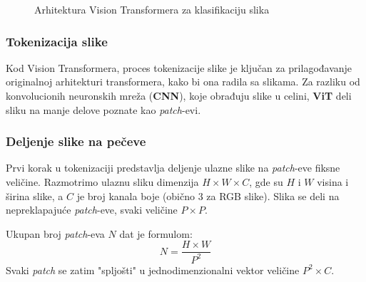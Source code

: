 \documentclass[12pt]{article}
\begin{document}
   \begin{figure}[h!]
      \centering
      \vspace{1cm} %
      \caption{Arhitektura Vision Transformera za klasifikaciju slika}
      \label{fig:vit_architecture}
   \end{figure}
   \newpage

   \subsubsection{Tokenizacija slike}
   Kod Vision Transformera, proces tokenizacije slike je ključan za prilagođavanje originalnoj arhitekturi 
   transformera, kako bi ona radila sa slikama. Za razliku od konvolucionih neuronskih mreža 
   (\textbf{CNN}), koje obrađuju slike u celini, \textbf{ViT} deli sliku na manje 
   delove poznate kao \textit{patch}-evi.
   
   \subsubsection*{Deljenje slike na pečeve}
   Prvi korak u tokenizaciji predstavlja deljenje ulazne slike na \textit{patch}-eve fiksne veličine. 
   Razmotrimo ulaznu sliku dimenzija \( H \times W \times C \), 
   gde su \( H \) i \( W \) visina i širina slike, a \( C \) je broj 
   kanala boje (obično 3 za RGB slike). Slika se deli na nepreklapajuće \textit{patch}-eve, 
   svaki veličine \( P \times P \).
   
   Ukupan broj \textit{patch}-eva \( N \) dat je formulom:
   \[
   N = \frac{H \times W}{P^2}
   \]
   Svaki \textit{patch} se zatim "spljošti" u jednodimenzionalni vektor 
   veličine \( P^2 \times C \).
   
\end{document}
